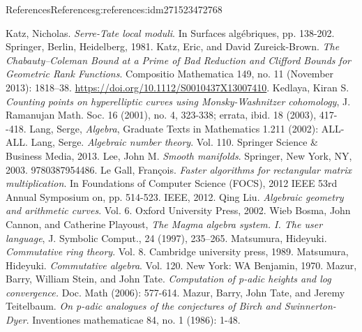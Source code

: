 \documentclass[oneside,10pt,]{book}
\numberwithin{equation}{section}
\begin{document}
\begin{references-chapter-numberless}{References}{}{References}{}{}{g:references:idm271523472768}
\begin{thebibliography}{9}
\hypertarget{x:biblio:bib-katz-serre-tate}{}Katz, Nicholas. \textit{Serre-Tate local moduli}. In Surfaces algébriques, pp. 138-202. Springer, Berlin, Heidelberg, 1981.
\hypertarget{x:biblio:bib-katz-zureick-clifford}{}Katz, Eric, and David Zureick-Brown. \textit{The Chabauty–Coleman Bound at a Prime of Bad Reduction and Clifford Bounds for Geometric Rank Functions}. Compositio Mathematica 149, no. 11 (November 2013): 1818–38. \url{https://doi.org/10.1112/S0010437X13007410}.
\hypertarget{x:biblio:bib-kedlaya-counting}{}Kedlaya, Kiran S. \textit{Counting points on hyperelliptic curves using Monsky-Washnitzer cohomology}, J. Ramanujan Math. Soc. 16 (2001), no. 4, 323-338; errata, ibid. 18 (2003), 417-{}-{}418.
\hypertarget{x:biblio:bib-lang-algebra}{}Lang, Serge,  \textit{Algebra}, Graduate Texts in Mathematics 1.211 (2002): ALL-ALL.
\hypertarget{x:biblio:bib-lang-algebraic-nt}{}Lang, Serge. \textit{Algebraic number theory}. Vol. 110. Springer Science \& Business Media, 2013.
\hypertarget{x:biblio:bib-lee-smooth}{}Lee, John M. \textit{Smooth manifolds}. Springer, New York, NY, 2003. 9780387954486.
\hypertarget{x:biblio:bib-le-gall}{}Le Gall, François. \textit{Faster algorithms for rectangular matrix multiplication}. In Foundations of Computer Science (FOCS), 2012 IEEE 53rd Annual Symposium on, pp. 514-523. IEEE, 2012.
\hypertarget{x:biblio:bib-liu}{}Qing Liu. \textit{Algebraic geometry and arithmetic curves}. Vol. 6. Oxford University Press, 2002.
\hypertarget{x:biblio:bib-magma}{}Wieb Bosma, John Cannon, and Catherine Playoust, \textit{The Magma algebra system. I. The user language}, J. Symbolic Comput., 24 (1997), 235–265.
\hypertarget{x:biblio:bib-matsumura}{}Matsumura, Hideyuki. \textit{Commutative ring theory}. Vol. 8. Cambridge university press, 1989.
\hypertarget{x:biblio:bib-matsumura-algebra}{}Matsumura, Hideyuki. \textit{Commutative algebra}. Vol. 120. New York: WA Benjamin, 1970.
\hypertarget{x:biblio:bib-mazur-stein-tate}{}Mazur, Barry, William Stein, and John Tate. \textit{Computation of p-adic heights and log convergence.} Doc. Math (2006): 577-614.
\hypertarget{x:biblio:bib-mtt}{}Mazur, Barry, John Tate, and Jeremy Teitelbaum. \textit{On p-adic analogues of the conjectures of Birch and Swinnerton-Dyer}. Inventiones mathematicae 84, no. 1 (1986): 1-48.

\end{thebibliography}
\end{references-chapter-numberless}
\end{document}
